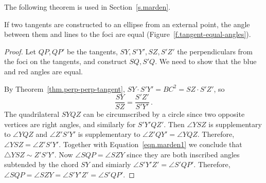 The following theorem is used in Section~\ref{s.marden}.

\begin{theorem}\label{thm.marden-tangent} If two tangents are constructed to an ellipse from an external point, the angle between them and lines to the foci are equal (Figure~\ref{f.tangent-equal-angles}).
\end{theorem}

\begin{proof}
Let $QP, QP'$ be the tangents, $SY, S'Y', SZ, S'Z'$ the perpendiculars
from the foci on the tangents, and construct $SQ,S'Q$. We need to show that the blue and red angles are equal. 

By Theorem~\ref{thm.perp-perp-tangent}, $SY\cdot S'Y'=BC^2= SZ\cdot S'Z'$, so
\begin{equation}\label{eqn.marden1}
\frac{SY}{SZ} = \frac{S'Z'}{S'Y'}\,.
\end{equation}
The quadrilateral $SYQZ$ can be circumscribed by a circle since two opposite vertices are right angles, and similarly for $S'Y'QZ'$. Then $\angle YSZ$ is supplementary to $\angle YQZ$ and $\angle Z'S'Y'$ is supplementary to $\angle Z'QY'=\angle YQZ$. Therefore, $\angle YSZ=\angle Z'S'Y'$. Together with Equation~\ref{eqn.marden1} we conclude that $\triangle YSZ\sim Z'S'Y'$. Now $\angle SQP = \angle SZY$ since they are both inscribed angles subtended by the chord $SY$ and simiarly $\angle S'Y'Z'=\angle S'QP'$. Therefore, $\angle SQP=\angle SZY = \angle S'Y'Z'=\angle S'QP'$.\hqed
\end{proof}

